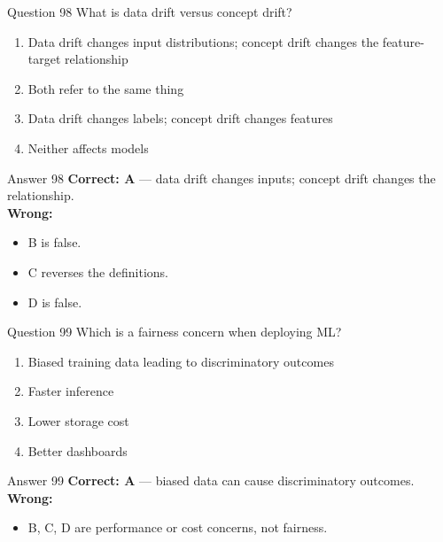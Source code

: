 \documentclass[aspectratio=169,11pt]{beamer}
\begin{document}
	\begin{frame}{Question 98}
		What is data drift versus concept drift?
		\begin{enumerate}[label=\Alph*.]
			\item Data drift changes input distributions; concept drift changes the feature-target relationship
			\item Both refer to the same thing
			\item Data drift changes labels; concept drift changes features
			\item Neither affects models
		\end{enumerate}
	\end{frame}
	\begin{frame}{Answer 98}
		\textbf{Correct: A} --- data drift changes inputs; concept drift changes the relationship.\\
		\vspace{0.5em}
		\textbf{Wrong:}
		\begin{itemize}
			\item B is false.
			\item C reverses the definitions.
			\item D is false.
		\end{itemize}
	\end{frame}
	
	\begin{frame}{Question 99}
		Which is a fairness concern when deploying ML?
		\begin{enumerate}[label=\Alph*.]
			\item Biased training data leading to discriminatory outcomes
			\item Faster inference
			\item Lower storage cost
			\item Better dashboards
		\end{enumerate}
	\end{frame}
	\begin{frame}{Answer 99}
		\textbf{Correct: A} --- biased data can cause discriminatory outcomes.\\
		\vspace{0.5em}
		\textbf{Wrong:}
		\begin{itemize}
			\item B, C, D are performance or cost concerns, not fairness.
		\end{itemize}
	\end{frame}
	
\end{document}

